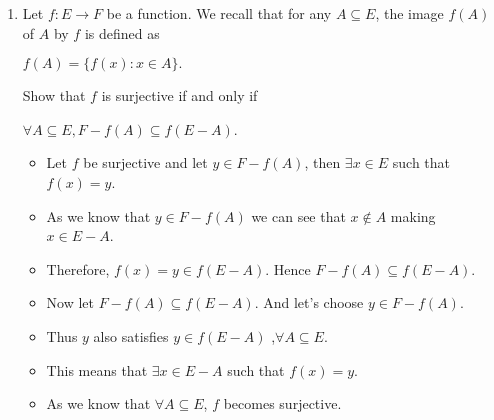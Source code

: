 \documentclass[letterpaper,12pt]{article}
\begin{document}
\begin{enumerate}
\item Let $f: E \rightarrow F$ be a function. We recall that for any $A \subseteq E$, the image $f(A)$ of $A$ by $f$ is defined as
\begin{center}
	$f(A) = \{f(x):x \in A\}.$
\end{center}
Show that $f$ is surjective if and only if 
\begin{center}
	$\forall A \subseteq E, F-f(A) \subseteq f(E-A)$.
\end{center}
\begin{itemize}
	\item Let $f$ be surjective and let $y \in F-f(A)$, then $\exists x \in E$ such that $f(x) = y$.
	\item As we know that $y \in F-f(A)$ we can see that $x \notin A$ making $x \in E-A$.
	\item Therefore, $f(x) = y \in f(E-A)$. Hence $F-f(A) \subseteq f(E-A).$
	\item Now let $F-f(A) \subseteq f(E-A)$. And let's choose $y \in F-f(A)$.
	\item Thus $y$ also satisfies $y \in f(E-A)$ ,$\forall A \subseteq E$.
	\item This means that $\exists x \in E-A$ such that $f(x) =y $.
	\item As we know that $\forall A \subseteq E$, $f$ becomes surjective.
\end{itemize}


\end{enumerate}
\end{document}

